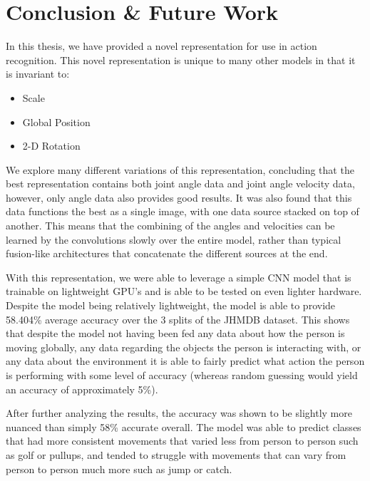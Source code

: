 
\chapter{Conclusion \& Future Work} %

\label{Conclusion}

In this thesis, we have provided a novel representation for use in action recognition. This novel representation is unique to many other models in that it is invariant to:

\begin{itemize}
	\item Scale
	\item Global Position
	\item 2-D Rotation
\end{itemize}

We explore many different variations of this representation, concluding that the best representation contains both joint angle data and joint angle velocity data, however, only angle data also provides good results. It was also found that this data functions the best as a single image, with one data source stacked on top of another. This means that the combining of the angles and velocities can be learned by the convolutions slowly over the entire model, rather than typical fusion-like architectures that concatenate the different sources at the end.

With this representation, we were able to leverage a simple CNN model that is trainable on lightweight GPU's and is able to be tested on even lighter hardware. Despite the model being relatively lightweight, the model is able to provide 58.404\% average accuracy over the 3 splits of the JHMDB dataset. This shows that despite the model not having been fed any data about how the person is moving globally, any data regarding the objects the person is interacting with, or any data about the environment it is able to fairly predict what action the person is performing with some level of accuracy (whereas random guessing would yield an accuracy of approximately 5\%).

After further analyzing the results, the accuracy was shown to be slightly more nuanced than simply 58\% accurate overall. The model was able to predict classes that had more consistent movements that varied less from person to person such as golf or pullups, and tended to struggle with movements that can vary from person to person much more such as jump or catch.

